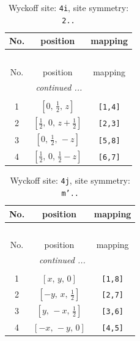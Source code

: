 \documentclass[fleqn,8pt]{jsarticle}
\begin{document}
\renewcommand{\arraystretch}{1.2}
\begin{longtable}{ccc}
\caption{Wyckoff site: {\tt 4i}, site symmetry: {\tt 2..}}
 \\
 \hline \hline
No. & position & mapping \\ \hline \endfirsthead

\multicolumn{2}{l}{\tablename\ \thetable{}} \\
 \hline \hline
No. & position & mapping \\ \hline \endhead

 \hline \hline
\multicolumn{2}{r}{\footnotesize\it continued ...} \\ \endfoot

 \hline \hline
\multicolumn{2}{r}{} \\ \endlastfoot

1 & $\left[ 0,\, \frac{1}{2},\, z \right]$ & {\tt [1,4]} \\ \hline
2 & $\left[ \frac{1}{2},\, 0,\, z + \frac{1}{2} \right]$ & {\tt [2,3]} \\ \hline
3 & $\left[ 0,\, \frac{1}{2},\, - z \right]$ & {\tt [5,8]} \\ \hline
4 & $\left[ \frac{1}{2},\, 0,\, \frac{1}{2} - z \right]$ & {\tt [6,7]} \\
\end{longtable}
\renewcommand{\arraystretch}{1.2}
\begin{longtable}{ccc}
\caption{Wyckoff site: {\tt 4j}, site symmetry: {\tt m'..}}
 \\
 \hline \hline
No. & position & mapping \\ \hline \endfirsthead

\multicolumn{2}{l}{\tablename\ \thetable{}} \\
 \hline \hline
No. & position & mapping \\ \hline \endhead

 \hline \hline
\multicolumn{2}{r}{\footnotesize\it continued ...} \\ \endfoot

 \hline \hline
\multicolumn{2}{r}{} \\ \endlastfoot

1 & $\left[ x,\, y,\, 0 \right]$ & {\tt [1,8]} \\ \hline
2 & $\left[ - y,\, x,\, \frac{1}{2} \right]$ & {\tt [2,7]} \\ \hline
3 & $\left[ y,\, - x,\, \frac{1}{2} \right]$ & {\tt [3,6]} \\ \hline
4 & $\left[ - x,\, - y,\, 0 \right]$ & {\tt [4,5]} \\
\end{longtable}
\end{document}
